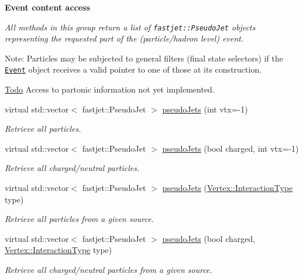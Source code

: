\begin{Indent}{\bf Event content access}\par
{\em All methods in this group return a list of {\tt fastjet::Pseudo\-Jet} objects representing the requested part of the (particle/hadron level) event.

\begin{Desc}
\item[Note:]Particles may be subjected to general filters (final state selectors) if the {\tt \hyperlink{classEvent}{Event}} object receives a valid pointer to one of those at its construction.\end{Desc}
\begin{Desc}
\item[\hyperlink{todo__todo000002}{Todo}]Access to partonic information not yet implemented. \end{Desc}
}\begin{CompactItemize}
\item 
virtual std::vector$<$ fastjet::Pseudo\-Jet $>$ \hyperlink{classEvent_d2dbb1309f93d3ebc6279ce5022afe1f}{pseudo\-Jets} (int vtx=-1)
\begin{CompactList}\small\item\em Retrieve all particles. \item\end{CompactList}\item 
virtual std::vector$<$ fastjet::Pseudo\-Jet $>$ \hyperlink{classEvent_dc48cfe91cb7b2a10b83ba65584dbd41}{pseudo\-Jets} (bool charged, int vtx=-1)
\begin{CompactList}\small\item\em Retrieve all charged/neutral particles. \item\end{CompactList}\item 
virtual std::vector$<$ fastjet::Pseudo\-Jet $>$ \hyperlink{classEvent_387e8007b9b02f09cdc6bcbdfae839dd}{pseudo\-Jets} (\hyperlink{classVertex_0d80a5c5ed3bd9be72a325aa448eca25}{Vertex::Interaction\-Type} type)
\begin{CompactList}\small\item\em Retrieve all particles from a given source. \item\end{CompactList}\item 
virtual std::vector$<$ fastjet::Pseudo\-Jet $>$ \hyperlink{classEvent_2b3dad2b39e8832a106796f6f9e35a3b}{pseudo\-Jets} (bool charged, \hyperlink{classVertex_0d80a5c5ed3bd9be72a325aa448eca25}{Vertex::Interaction\-Type} type)
\begin{CompactList}\small\item\em Retrieve all charged/neutral particles from a given source. \item\end{CompactList}\end{CompactItemize}
\end{Indent}
